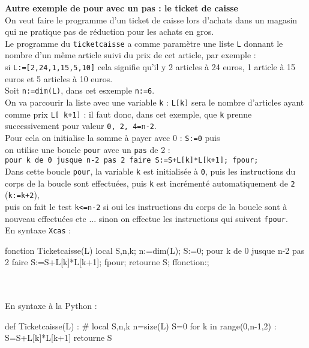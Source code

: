 \documentclass[12pt,a4paper]{book}
\begin{document}
\begin{giacjshere}
{\bf Autre exemple de pour avec un pas : le ticket de caisse}\\
On veut faire le programme d'un ticket de caisse lors d'achats dans 
un magasin qui ne pratique pas de r\'eduction pour les achats en gros.\\
Le programme du {\tt ticketcaisse} a comme param\`etre une liste {\tt L} donnant
le nombre d'un m\^eme article suivi du prix de cet article, par exemple :\\
 si {\tt L:=[2,24,1,15,5,10]} cela signifie qu'il y 2 articles \`a 24 euros, 1 
article  \`a 15 euros et 5 articles  \`a 10 euros.\\
Soit {\tt n:=dim(L)}, dans cet esxemple {\tt n:=6}.\\
On va  parcourir la liste avec une variable {\tt k} : {\tt L[k]} sera le nombre 
d'articles ayant  comme prix {\tt L[ k+1]} : il faut donc, dans cet exemple,
 que {\tt k} prenne successivement pour valeur {\tt 0, 2, 4=n-2}.\\
Pour cela on initialise la somme \`a payer avec 0 : {\tt S:=0} puis\\
 on utilise une boucle {\tt pour} avec un {\tt pas} de 2 :\\ 
{\tt pour k de 0 jusque n-2 pas 2 faire S:=S+L[k]*L[k+1]; fpour;}\\
Dans cette boucle {\tt pour}, la variable {\tt k} est initialis\'ee \`a 
{\tt 0}, puis les instructions du corps de la boucle sont effectu\'ees,
puis {\tt k} est incr\'ement\'e automatiquement de {\tt 2} ({\tt k:=k+2}),\\
puis on fait le test {\tt k<=n-2} si oui les instructions du corps de la boucle 
sont \`a nouveau effectu\'ees etc ... sinon on effectue les instructions qui 
suivent {\tt fpour}.\\
En syntaxe {\tt Xcas} :
\begin{giaconload}
fonction Ticketcaisse(L) 
 local S,n,k;
 n:=dim(L);
 S:=0;
 pour k de 0 jusque n-2 pas 2 faire S:=S+L[k]*L[k+1]; fpour;
 retourne S; 
ffonction:;
\end{giaconload}
\\
\\
En syntaxe \`a la Python :
\begin{giacprog}
def Ticketcaisse(L) :
    # local S,n,k
    n=size(L)
    S=0
    for k in range(0,n-1,2) :
        S=S+L[k]*L[k+1]
    retourne S 
\end{giacprog}
\\


\end{giacjshere}
\end{document}
